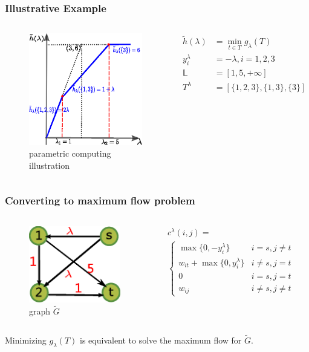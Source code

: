 \documentclass[notheorems]{beamer}
\begin{document}
\begin{frame}
	\frametitle{Illustrative Example}
\begin{columns}
	\column{5cm}
	\begin{figure}
		\includegraphics[width=5cm]{paper/pic/example_pst_single.eps}
		\caption{parametric computing illustration}
	\end{figure}
	\column{5cm}
	\begin{align*}
	\tilde{h}(\lambda) &= \min_{t \in T} g_{\lambda}(T)\\
	y^{\lambda}_i & = -\lambda, i=1,2,3 \\
    \mathbb{L} & = [1, 5, +\infty] \\
	T^{\lambda} &= [\{1,2,3\}, \{1,3\}, \{3\}]
	\end{align*}
\end{columns}	
\end{frame}	
\begin{frame}
	\frametitle{Converting to maximum flow problem}
\begin{columns}
	\column{4cm}
	\begin{figure}
		\includegraphics[width=4cm]{paper/pic/example_st.eps}
		\caption{graph $\widetilde{G}$}
	\end{figure}
	\column{6cm}
	\begin{align*}
		& c^{\lambda}(i, j)  = \\ 
		& \begin{cases}
			\max\{0, -y^{\lambda}_i\} &  i = s, j \neq t \\
			w_{it} + \max\{0, y^{\lambda}_i\} & i\neq s, j = t\\
			0 & i = s, j = t\\
			w_{ij} & i \neq s, j \neq t
		\end{cases}
	\end{align*}
\end{columns}	
Minimizing $g_{\lambda}(T)$ is equivalent to solve the maximum flow for $\widetilde{G}$.
\end{frame}	
\end{document}

